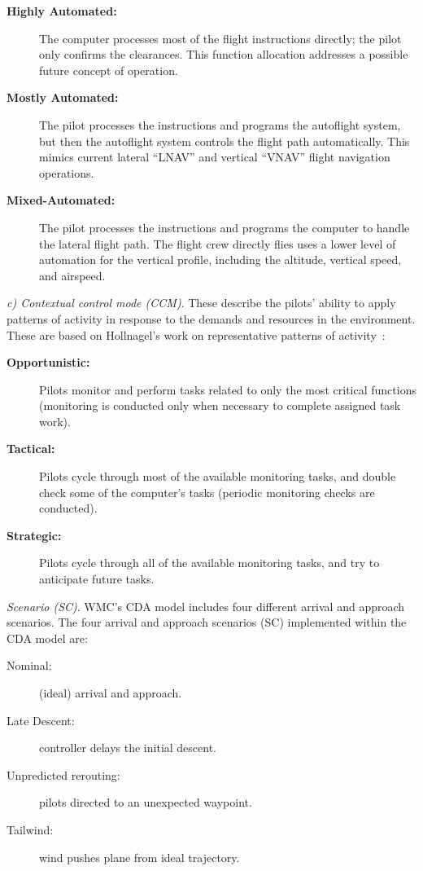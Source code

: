 \documentclass[journal]{IEEEtran}
\newcommand{\bd}{\begin{description}}
\newcommand{\ed}{\end{description}}
\newcommand{\be}{\begin{enumerate}}
\newcommand{\ee}{\end{enumerate}}
\begin{document}
\bd
\item[{\bf Highly Automated:}] The computer processes most of the flight instructions directly; the pilot only confirms the clearances. This function allocation addresses a possible future concept of operation.
\item[{\bf Mostly Automated:}] The pilot processes the instructions and programs the autoflight system, but then the autoflight
system controls the flight path automatically. This mimics current lateral “LNAV” and vertical “VNAV” flight navigation operations.
\item[{\bf Mixed-Automated:}] The pilot processes the instructions and programs the computer to handle the lateral flight path. The flight crew directly flies uses a lower level of automation for the vertical profile, including the altitude, vertical speed, and airspeed.
\ed

{\em c) Contextual control mode  (CCM)}. These describe the pilots' ability to apply patterns of activity in response to the demands and resources in the environment. These are based on Hollnagel’s work on representative patterns of activity~\cite{Hollnagel1993}:
\bd
\item[{\bf Opportunistic:}] Pilots monitor and perform tasks related to only the most critical functions (monitoring is conducted only when necessary to complete assigned task work).
\item[{\bf Tactical:}] Pilots cycle through most of the available monitoring tasks, and double check some of the computer’s tasks (periodic monitoring checks are conducted).
\item[{\bf Strategic:}] Pilots cycle through all of the available monitoring tasks, and try to anticipate future tasks.
\ed

{\em Scenario (SC)}.
WMC’s CDA model includes four different arrival and
approach scenarios. The four arrival and approach scenarios (SC) implemented within the CDA model are: 
\begin{description}
\item[Nominal:] (ideal) arrival and approach.
\item[Late Descent:] controller delays the initial descent.
\item[Unpredicted rerouting:]  pilots  directed to an unexpected waypoint.
\item[Tailwind:] wind  pushes  plane from  ideal trajectory.
\end{description} 

 
 
\end{document}
